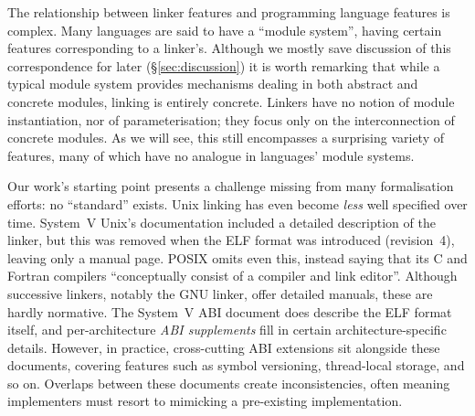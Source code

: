
The relationship between linker features and programming language features is complex.
Many languages are said to have a ``module system'', having certain features corresponding to a linker's.
Although we mostly save discussion of this correspondence for later (\S\ref{sec:discussion})
it is worth remarking that while a typical module system provides mechanisms dealing in both abstract and concrete modules, linking is entirely concrete.
Linkers have no notion of module instantiation, nor of parameterisation; they focus only on the interconnection of concrete modules.
As we will see, this still encompasses a surprising variety of features, many of which have no analogue in languages' module systems.


Our work's starting point presents a challenge missing from many formalisation efforts:
no ``standard'' exists.
Unix linking has even become \emph{less} well specified over time.
System~V Unix's documentation included a detailed description of the linker,
but this was removed when the ELF format was introduced (revision~4), 
leaving only a manual page.
POSIX \citep{} omits even this, instead saying that its C and Fortran compilers 
``conceptually consist of a compiler and link editor''.
Although successive linkers, notably the GNU linker, offer detailed manuals, 
these are hardly normative.
The System~V ABI document \citep{} does describe the ELF format itself,
and per-architecture \emph{ABI supplements} fill in certain architecture-specific
details.
However, in practice, cross-cutting ABI extensions sit alongside these documents, covering features such as symbol versioning, thread-local storage, and so on.
Overlaps between these documents create inconsistencies, often meaning implementers must resort to mimicking a pre-existing implementation.
